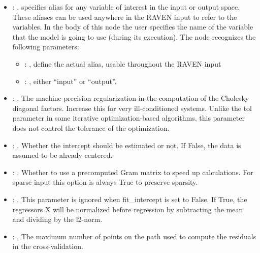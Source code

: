 \begin{itemize}
    \item {}: , 
      specifies alias for         any variable of interest in the input or output space. These
      aliases can be used anywhere in the RAVEN input to         refer to the variables. In the body
      of this node the user specifies the name of the variable that the model is going to use
      (during its execution).
      The  node recognizes the following parameters:
        \begin{itemize}
          \item {}: , 
            define the actual alias, usable throughout the RAVEN input
          \item {}: , 
            either ``input'' or ``output''.
      \end{itemize}

    \item {}: , 
      The machine-precision regularization in the computation of the Cholesky
      diagonal factors. Increase this for very ill-conditioned systems. Unlike the tol
      parameter in some iterative optimization-based algorithms, this parameter does not
      control the tolerance of the optimization.

    \item {}: , 
      Whether the intercept should be estimated or not. If False,
      the data is assumed to be already centered.

    \item {}: , 
      Whether to use a precomputed Gram matrix to speed up calculations.
      For sparse input this option is always True to preserve sparsity.

    \item {}: , 
      This parameter is ignored when fit\_intercept is set to False. If True,
      the regressors X will be normalized before regression by subtracting the mean and
      dividing by the l2-norm.

    \item {}: , 
      The maximum number of points on the path used to compute the
      residuals in the cross-validation.


\end{itemize}
